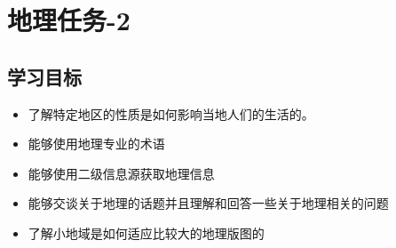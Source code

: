 \chapter{地理任务-2}

\section{学习目标}
    \begin{itemize}
      \item 了解特定地区的性质是如何影响当地人们的生活的。
      \item 能够使用地理专业的术语
      \item 能够使用二级信息源获取地理信息
      \item 能够交谈关于地理的话题并且理解和回答一些关于地理相关的问题
      \item 了解小地域是如何适应比较大的地理版图的
    \end{itemize}  

